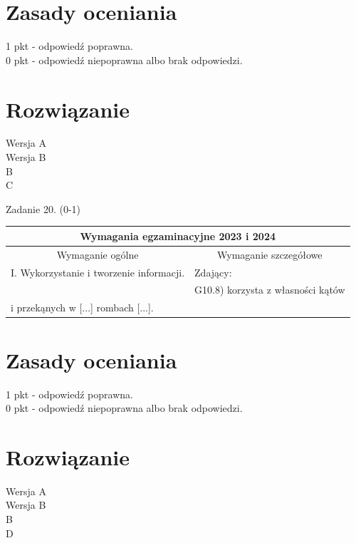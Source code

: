 \documentclass[10pt]{article}
\begin{document}
\section*{Zasady oceniania}
1 pkt - odpowiedź poprawna.\\
0 pkt - odpowiedź niepoprawna albo brak odpowiedzi.

\section*{Rozwiązanie}
Wersja A\\
Wersja B\\
B\\
C

Zadanie 20. (0-1)

\begin{center}
\begin{tabular}{|l|l|}
\hline
\multicolumn{2}{|c|}{Wymagania egzaminacyjne 2023 i 2024} \\
\hline
\multicolumn{1}{|c|}{Wymaganie ogólne} & \multicolumn{1}{c|}{Wymaganie szczegółowe} \\
\hline
I. Wykorzystanie i tworzenie informacji. & Zdający: \\
 & G10.8) korzysta z własności kątów \\
i przekąnych w [...] rombach [...]. &  \\
\hline
\end{tabular}
\end{center}

\section*{Zasady oceniania}
1 pkt - odpowiedź poprawna.\\
0 pkt - odpowiedź niepoprawna albo brak odpowiedzi.

\section*{Rozwiązanie}
Wersja A\\
Wersja B\\
B\\
D
\end{document}
